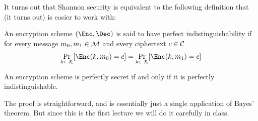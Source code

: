 It turns out that Shannon security is equivalent to the following definition that (it turns out) is easier to work with:
\begin{definition}
 An encryption scheme $(\Enc,\Dec)$ is said to have perfect indistinguishability if for every message $m_0,m_1\in{\cal M}$ and every ciphertext $c\in{\cal C}$
        \[
        \Pr_{k\gets {\cal K}}[\Enc(k,m_0)=c]= \Pr_{k\gets {\cal K}}[\Enc(k,m_1)=c]
        \]


\end{definition}

\begin{claim}
    An encryption scheme is perfectly secret  if and only if it is perfectly indistinguishable.
\end{claim}
 The proof is straightforward, and is essentially just a single application of Bayes’ theorem.  But since this is the first lecture we will do it carefully in class.
